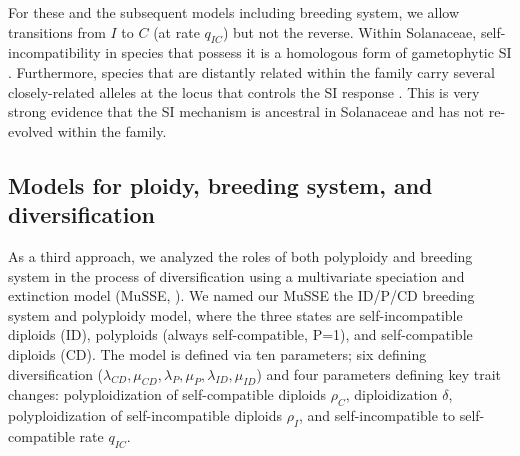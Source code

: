 For these and the subsequent models including breeding system, we allow transitions from $I$ to $C$ (at rate $q_{IC}$) but not the reverse.
Within Solanaceae, self-incompatibility in species that possess it is a homologous form of gametophytic SI \citep[shared even shared even with other dicot families;][]{igic_2001, steinbachs_2002}.
Furthermore, species that are distantly related within the family carry several closely-related alleles at the locus that controls the SI response \citep{ioerger_1990, igic_2006}.
This is very strong evidence that the SI mechanism is ancestral in Solanaceae and has not re-evolved within the family.

\subsection{Models for ploidy, breeding system, and diversification}

As a third approach, we analyzed the roles of both polyploidy and breeding system in the process of diversification using a multivariate speciation and extinction model (MuSSE, \citet{fitzjohn_2012}).  We named our MuSSE the ID/P/CD breeding system and polyploidy model, where the three states are self-incompatible diploids (ID), polyploids (always self-compatible, P=1), and self-compatible diploids (CD). The model is defined via ten parameters; six defining diversification ($\lambda_{CD}, \mu_{CD},\lambda_{P},\mu_{P}, \lambda_{ID},\mu_{ID}$) and  four parameters defining key trait changes: polyploidization of self-compatible diploids $\rho_{C}$, diploidization $\delta$, polyploidization of self-incompatible diploids $\rho_{I}$, and self-incompatible to self-compatible rate $q_{IC}$.



